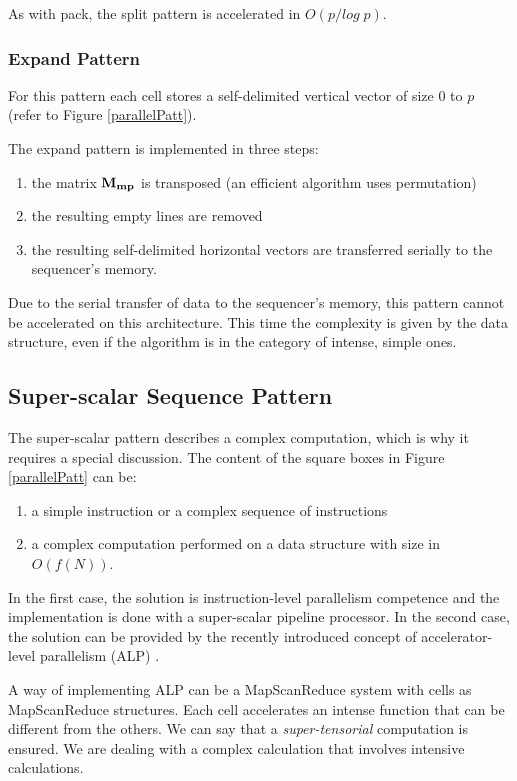 As with pack, the split pattern is accelerated in $O(p/log \; p)$.

\subsubsection{Expand  Pattern}

For this pattern each cell stores a self-delimited vertical vector of size $0$ to $p$ (refer to  Figure \ref{parallelPatt}).

The expand  pattern is implemented in three steps:
\begin{enumerate}
    \item the matrix ${\bf M_{mp}}$ is transposed (an efficient algorithm uses permutation)
    \item the resulting empty lines are removed
    \item the resulting self-delimited horizontal vectors are transferred serially to the sequencer's memory.
\end{enumerate}

Due to the serial transfer of data to the sequencer's memory, this pattern cannot be accelerated on this architecture. This time the complexity is given by the data structure, even if the algorithm is in the category of intense, simple ones.

\subsection{Super-scalar Sequence Pattern}

The super-scalar pattern describes a complex computation, which is why it requires a special discussion. The content of the square boxes in Figure \ref{parallelPatt} can be:
\begin{enumerate}
\item a simple instruction or a complex sequence of instructions
\item a complex computation performed on a data structure with size in $O(f(N))$.
\end{enumerate}
In the first case, the solution is  instruction-level parallelism competence and the implementation is done with a super-scalar pipeline processor. In the second case, the solution can be provided by the recently introduced concept of accelerator-level parallelism (ALP) \cite{Hill}.

A way of implementing ALP can be a MapScanReduce system with cells as MapScanReduce structures. Each cell accelerates an intense function that can be different from the others. We can say that a {\em super-tensorial} computation is ensured. We are dealing with a complex calculation that involves intensive calculations.